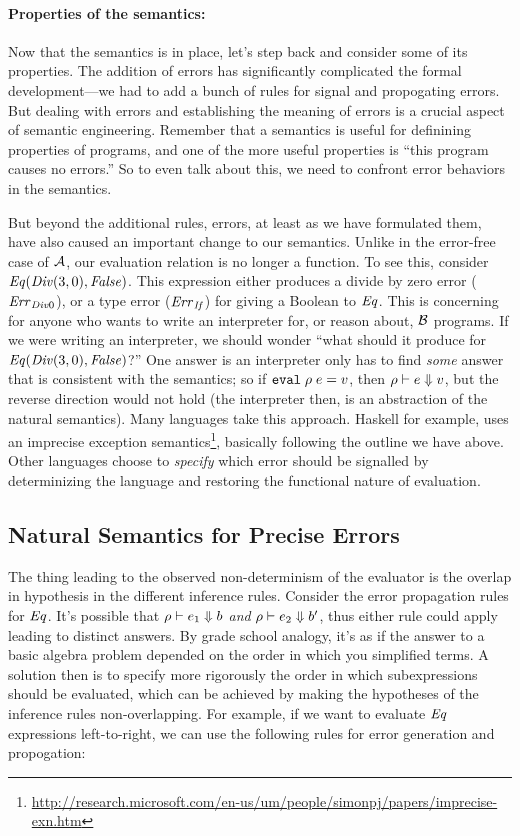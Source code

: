 \paragraph{Properties of the semantics:}
Now that the semantics is in place, let's step back and consider some
of its properties.  The addition of errors has significantly
complicated the formal development---we had to add a bunch of rules
for signal and propogating errors.  But dealing with errors and
establishing the meaning of errors is a crucial aspect of semantic
engineering.  Remember that a semantics is useful for definining
properties of programs, and one of the more useful properties is
``this program causes no errors.''  So to even talk about this, we
need to confront error behaviors in the semantics.

But beyond the additional rules, errors, at least as we have
formulated them, have also caused an important change to our
semantics.  Unlike in the error-free case of $\mathcal{A}$, our evaluation
relation is no longer a function.  To see this, consider
$\mathit{Eq}(\mathit{Div}(3,0),\mathit{False})$.  This expression either produces a divide by
zero error ($\mathit{Err}_{\mathit{Div}0}$), or a type error ($\mathit{Err}_{\mathit{If}}$) for giving a
Boolean to $\mathit{Eq}$.  This is concerning for anyone who wants to write an
interpreter for, or reason about, $\mathcal{B}$ programs.  If we were
writing an interpreter, we should wonder ``what should it produce for
$\mathit{Eq}(\mathit{Div}(3,0),\mathit{False})$?''  One answer is an interpreter only has to
find \emph{some} answer that is consistent with the semantics; so if
${\tt eval}\; \rho\; e = v$, then ${\rho} \vdash {e} \Downarrow {v}$,
but the reverse direction would not hold (the interpreter then, is an
abstraction of the natural semantics).  Many languages take this
approach.  Haskell for example, uses an imprecise exception
semantics\footnote{\url{http://research.microsoft.com/en-us/um/people/simonpj/papers/imprecise-exn.htm}},
basically following the outline we have above.  Other languages choose
to \emph{specify} which error should be signalled by determinizing the
language and restoring the functional nature of evaluation.

\subsection{Natural Semantics for Precise Errors}

The thing leading to the observed non-determinism of the evaluator is
the overlap in hypothesis in the different inference rules.  Consider the error
propagation rules for $\mathit{Eq}$.  It's possible that
${\rho} \vdash {e_1} \Downarrow {b}$ \emph{and}
${\rho} \vdash {e_2} \Downarrow {b'}$, thus either rule could apply leading
to distinct answers.  By grade school analogy, it's as if the answer
to a basic algebra problem depended on the order in which you
simplified terms.  A solution then is to specify more rigorously the
order in which subexpressions should be evaluated, which can be
achieved by making the hypotheses of the inference rules
non-overlapping.  For example, if we want to evaluate $\mathit{Eq}$
expressions left-to-right, we can use the following rules for error
generation and propogation:

